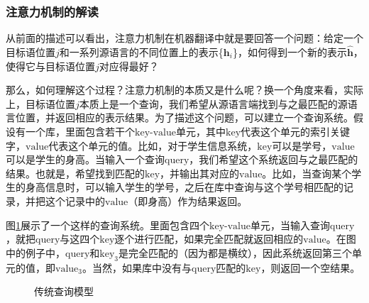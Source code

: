 
\subsubsection{注意力机制的解读}
\label{sec:6.3.4.3}

\parinterval 从前面的描述可以看出，注意力机制在机器翻译中就是要回答一个问题：给定一个目标语位置$j$和一系列源语言的不同位置上的表示\{${\mathbf{h}_i}$\}，如何得到一个新的表示$\hat{\mathbf{h}}$，使得它与目标语位置$j$对应得最好？

\parinterval 那么，如何理解这个过程？注意力机制的本质又是什么呢？换一个角度来看，实际上，目标语位置$j$本质上是一个查询，我们希望从源语言端找到与之最匹配的源语言位置，并返回相应的表示结果。为了描述这个问题，可以建立一个查询系统。假设有一个库，里面包含若干个$\mathrm{key}$-$\mathrm{value}$单元，其中$\mathrm{key}$代表这个单元的索引关键字，$\mathrm{value}$代表这个单元的值。比如，对于学生信息系统，$\mathrm{key}$可以是学号，$\mathrm{value}$可以是学生的身高。当输入一个查询$\mathrm{query}$，我们希望这个系统返回与之最匹配的结果。也就是，希望找到匹配的$\mathrm{key}$，并输出其对应的$\mathrm{value}$。比如，当查询某个学生的身高信息时，可以输入学生的学号，之后在库中查询与这个学号相匹配的记录，并把这个记录中的$\mathrm{value}$（即身高）作为结果返回。

\parinterval 图\ref{fig:6-26}展示了一个这样的查询系统。里面包含四个$\mathrm{key}$-$\mathrm{value}$单元，当输入查询$\mathrm{query}$，就把$\mathrm{query}$与这四个$\mathrm{key}$逐个进行匹配，如果完全匹配就返回相应的$\mathrm{value}$。在图中的例子中，$\mathrm{query}$和$\mathrm{key}_3$是完全匹配的（因为都是横纹），因此系统返回第三个单元的值，即$\mathrm{value}_3$。当然，如果库中没有与$\mathrm{query}$匹配的$\mathrm{key}$，则返回一个空结果。

\begin{figure}[htp]
\centering

\caption{传统查询模型}
\label{fig:6-26}
\end{figure}

